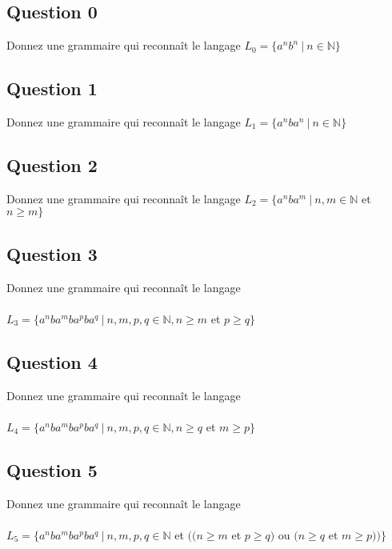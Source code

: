\documentclass{article}[11pt]
\theoremstyle{definition}
\begin{document}
\subsection*{Question 0}

Donnez une grammaire qui reconnaît le langage $L_0 = \{a^nb^n~|~n \in \mathbb{N}\}$

\subsection*{Question 1}

Donnez une grammaire qui reconnaît le langage $L_1 = \{a^nba^n~|~n \in \mathbb{N}\}$


\subsection*{Question 2}

Donnez une grammaire qui reconnaît le langage $L_2 = \{a^nba^m~|~n,m \in \mathbb{N}$ et $ n \geq m\}$

\subsection*{Question 3}

Donnez une grammaire qui reconnaît le langage 

\paragraph*{}$L_3 = \{a^nba^mba^pba^q~|~n,m,p,q \in \mathbb{N}, n \geq m$ et $p \geq q\}$

\subsection*{Question 4}

Donnez une grammaire qui reconnaît le langage 

\paragraph*{}$L_4 = \{a^nba^mba^pba^q~|~n,m,p,q \in \mathbb{N}, n \geq q$ et $m \geq p\}$

\subsection*{Question 5}

Donnez une grammaire qui reconnaît le langage 

\paragraph*{}$L_5 = \{a^nba^mba^pba^q~|~n,m,p,q \in \mathbb{N}$ et $((n \geq m$ et $p \geq q)$ ou $(n \geq q$ et $m \geq p))\}$
\end{document}
